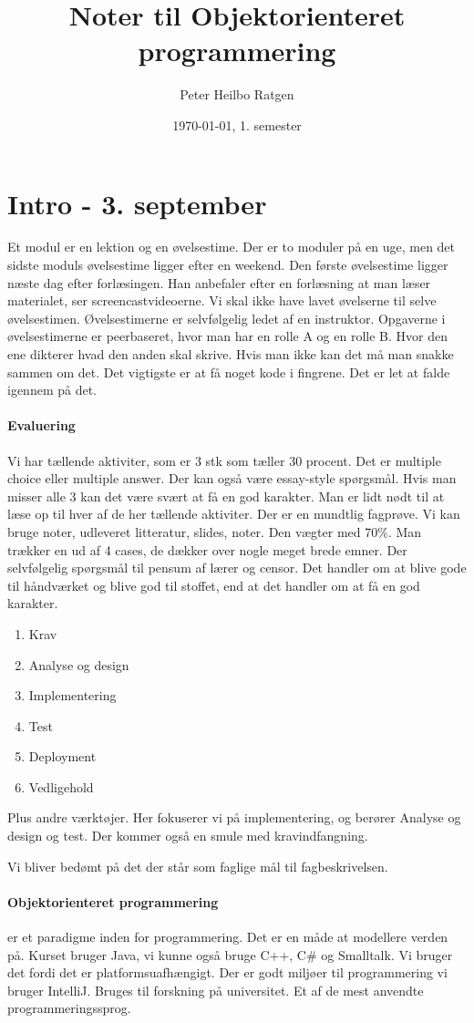 \documentclass{article}
\title{Noter til Objektorienteret programmering}
\author{Peter Heilbo Ratgen}
\date{\today, 1. semester}
\begin{document}
  \maketitle
  \newpage
  \tableofcontents
  \newpage
  \section{Intro - 3. september}
  Et modul er en lektion og en øvelsestime. Der er to moduler på en uge, men det
  sidste moduls øvelsestime ligger efter en weekend. Den første øvelsestime
  ligger næste dag efter forlæsingen.
  Han anbefaler efter en forlæsning at man læser materialet, ser
  screencastvideoerne. Vi skal ikke have lavet øvelserne til selve øvelsestimen.
  Øvelsestimerne er selvfølgelig ledet af en instruktor. Opgaverne i
  øvelsestimerne er peerbaseret, hvor man har en rolle A og en rolle B. Hvor den
  ene dikterer hvad den anden skal skrive. Hvis man ikke kan det må man snakke
  sammen om det. Det vigtigste er at få noget kode i fingrene. Det er let at
  falde igennem på det.

  \paragraph{Evaluering}
  Vi har tællende aktiviter, som er 3 stk som tæller 30 procent. Det er multiple
  choice eller multiple answer. Der kan også være essay-style spørgsmål. Hvis
  man misser alle 3 kan det være svært at få en god karakter. Man er lidt nødt
  til at læse op til hver af de her tællende aktiviter.
  Der er en mundtlig fagprøve. Vi kan bruge noter, udleveret litteratur, slides,
  noter. Den vægter med 70\%. Man trækker en ud af 4 cases, de dækker over nogle
  meget brede emner. Der selvfølgelig spørgsmål til pensum af lærer og censor.
  Det handler om at blive gode til håndværket og blive god til stoffet, end at
  det handler om at få en god karakter.
  \begin{enumerate}
    \item Krav
    \item Analyse og design
    \item Implementering
    \item Test
    \item Deployment
    \item Vedligehold
  \end{enumerate}
  Plus andre værktøjer. Her fokuserer vi på implementering, og berører Analyse
  og design og test. Der kommer også en smule med kravindfangning.

  Vi bliver bedømt på det der står som faglige mål til fagbeskrivelsen.
  
  \paragraph{Objektorienteret programmering}
  er et paradigme inden for programmering. Det er en måde at modellere verden
  på. Kurset bruger Java, vi kunne også bruge C++, C\# og Smalltalk. Vi bruger
  det fordi det er platformsuafhængigt. Der er godt miljøer  til programmering
  vi bruger IntelliJ. Bruges til forskning på universitet. Et af de mest
  anvendte programmeringssprog. 
  
\end{document}
